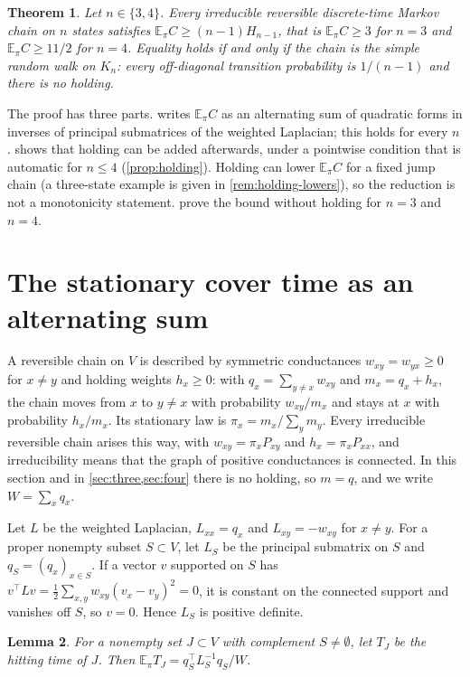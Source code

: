 \documentclass[11pt]{amsart}
\newtheorem{theorem}{Theorem}
\newtheorem{lemma}[theorem]{Lemma}
\theoremstyle{remark}
\newcommand{\E}{\mathbb{E}}
\begin{document}
\begin{theorem}\label{thm:main}
Let $n\in\{3,4\}$. Every irreducible reversible discrete-time Markov chain on $n$ states satisfies
$\E_\pi C\ge (n-1)H_{n-1}$, that is $\E_\pi C\ge 3$ for $n=3$ and $\E_\pi C\ge 11/2$ for $n=4$. Equality holds if and
only if the chain is the simple random walk on $K_n$: every off-diagonal transition probability is $1/(n-1)$ and
there is no holding.
\end{theorem}

The proof has three parts.  writes $\E_\pi C$ as an alternating sum of quadratic forms in inverses
of principal submatrices of the weighted Laplacian; this holds for every $n$.  shows that holding
can be added afterwards, under a pointwise condition that is automatic for $n\le4$
(\cref{prop:holding}). Holding can lower $\E_\pi C$ for a fixed jump chain (a three-state example is given in
\cref{rem:holding-lowers}), so the reduction is not a monotonicity statement.  prove the
bound without holding for $n=3$ and $n=4$.

\section{The stationary cover time as an alternating sum}\label{sec:formula}

A reversible chain on $V$ is described by symmetric conductances $w_{xy}=w_{yx}\ge0$ for $x\ne y$ and holding weights
$h_x\ge0$: with $q_x=\sum_{y\ne x}w_{xy}$ and $m_x=q_x+h_x$, the chain moves from $x$ to $y\ne x$ with probability
$w_{xy}/m_x$ and stays at $x$ with probability $h_x/m_x$. Its stationary law is $\pi_x=m_x/\sum_ym_y$. Every
irreducible reversible chain arises this way, with $w_{xy}=\pi_xP_{xy}$ and $h_x=\pi_xP_{xx}$, and irreducibility means
that the graph of positive conductances is connected. In this section and in \cref{sec:three,sec:four} there is no
holding, so $m=q$, and we write $W=\sum_xq_x$.

Let $L$ be the weighted Laplacian, $L_{xx}=q_x$ and $L_{xy}=-w_{xy}$ for $x\ne y$. For a proper nonempty subset
$S\subset V$, let $L_S$ be the principal submatrix on $S$ and $q_S=(q_x)_{x\in S}$. If a vector $v$ supported on $S$
has $v^{\top}Lv=\tfrac12\sum_{x,y}w_{xy}(v_x-v_y)^2=0$, it is constant on the connected support and vanishes off $S$,
so $v=0$. Hence $L_S$ is positive definite.

\begin{lemma}\label{lem:hitting}
For a nonempty set $J\subset V$ with complement $S\ne\emptyset$, let $T_J$ be the hitting time of $J$. Then
$\E_\pi T_J=q_S^{\top}L_S^{-1}q_S/W$.
\end{lemma}
\end{document}

